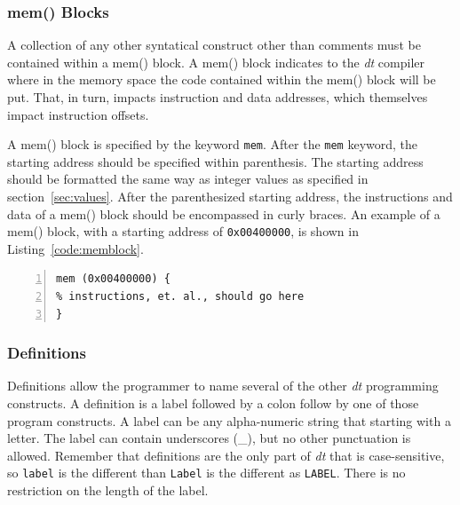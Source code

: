 \begin{lstlisting}[label=code:comment,caption=Code example of a comment,basicstyle=\footnotesize,numbers=left,numberstyle=\tiny,stepnumber=1, numbersep=6pt,frame=single,captionpos=b,escapechar=@]
% This is a comment.
\end{lstlisting}

\subsubsection{mem() Blocks}

A collection of any other syntatical construct other 
than comments must be contained within a mem() block.  
A mem() block indicates to the \emph{dt} compiler where
in the memory space the code contained within the mem() block
will be put.  That, in turn, impacts instruction and data
addresses, which themselves impact instruction offsets.

A mem() block is specified by the keyword \texttt{mem}. After 
the \texttt{mem} keyword, the starting address should be specified
within parenthesis.  The starting address should be formatted the 
same way as integer values as specified in section~\ref{sec:values}.
After the parenthesized starting address, the instructions and data of 
a mem() block 
should be encompassed in curly braces.  An example of a mem() 
block, with a starting address of \texttt{0x00400000}, is shown 
in Listing~\ref{code:memblock}.

\begin{lstlisting}[label=code:memblock,caption=Code example of a mem() block,basicstyle=\footnotesize,numbers=left,numberstyle=\tiny,stepnumber=1, numbersep=6pt,frame=single,captionpos=b,escapechar=@]
mem (0x00400000) {
% instructions, et. al., should go here 
}
\end{lstlisting}

\subsubsection{Definitions\label{sec:definitions}}

Definitions allow the programmer to name several of the
other \emph{dt} programming constructs.  A definition is 
a label followed by a colon follow by one of those 
program constructs.  A label can be any alpha-numeric 
string that starting with a letter.  The label can 
contain underscores (\_), but no other punctuation is 
allowed.  Remember that definitions are the only 
part of \emph{dt} that is  case-sensitive, 
so \texttt{label} is the different than \texttt{Label} is the 
different as \texttt{LABEL}.  There is no restriction on 
the length of the label.

